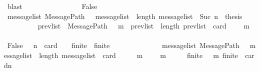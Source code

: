 \begin{isabellebody}
\ blast\isanewline
\ \ \ \ \ \ \isamarkupfalse%
\isanewline
\ \ \ \ \ \ \ \ \isamarkupfalse%
\ False\isanewline
\ \ \ \ \ \ \ \ \isamarkupfalse%
\ {\isachardoublequoteopen}{\isasymAnd}message{\isacharunderscore}list{\isachardot}\ MessagePath\ {\isasymsigma}\ {\isasymsigma}{\isacharprime}\ message{\isacharunderscore}list\ {\isasymand}\ length\ message{\isacharunderscore}list\ {\isacharequal}\ Suc\ n\ {\isasymLongrightarrow}\ thesis{\isachardoublequoteclose}\isanewline
\ \ \ \ \ \ \ \ \isamarkupfalse%
\ prev{\isacharunderscore}list\ \ {\isachardoublequoteopen}MessagePath\ {\isacharparenleft}{\isasymsigma}\ {\isasymunion}\ {\isacharbraceleft}m{\isacharbraceright}{\isacharparenright}\ {\isasymsigma}{\isacharprime}\ prev{\isacharunderscore}list\ {\isasymand}\ length\ prev{\isacharunderscore}list\ {\isacharequal}\ card\ {\isacharparenleft}{\isasymsigma}{\isacharprime}\ {\isacharminus}\ {\isacharparenleft}{\isasymsigma}\ {\isasymunion}\ {\isacharbraceleft}m{\isacharbraceright}{\isacharparenright}{\isacharparenright}{\isachardoublequoteclose}\isanewline
\ \ \ \ \ \ \ \ \ \ \isamarkupfalse%
\ False\ {\isacartoucheopen}{\isasymAnd}{\isasymsigma}{\isacharprime}\ {\isasymsigma}{\isachardot}\ {\isasymlbrakk}n\ {\isacharequal}\ card\ {\isacharparenleft}{\isasymsigma}{\isacharprime}\ {\isacharminus}\ {\isasymsigma}{\isacharparenright}{\isacharsemicolon}\ finite\ {\isasymsigma}{\isacharsemicolon}\ finite\ {\isasymsigma}{\isacharprime}{\isacharsemicolon}\ {\isasymsigma}\ {\isasymnoteq}\ {\isasymsigma}{\isacharprime}{\isacharsemicolon}\ {\isasymsigma}\ {\isasymin}\ {\isasymSigma}{\isacharsemicolon}\ {\isasymsigma}{\isacharprime}\ {\isasymin}\ {\isasymSigma}{\isacharsemicolon}\ {\isasymsigma}\ {\isasymsubseteq}\ {\isasymsigma}{\isacharprime}{\isasymrbrakk}\ {\isasymLongrightarrow}\ {\isasymexists}message{\isacharunderscore}list{\isachardot}\ MessagePath\ {\isasymsigma}\ {\isasymsigma}{\isacharprime}\ message{\isacharunderscore}list\ {\isasymand}\ length\ message{\isacharunderscore}list\ {\isacharequal}\ card\ {\isacharparenleft}{\isasymsigma}{\isacharprime}\ {\isacharminus}\ {\isasymsigma}{\isacharparenright}{\isacartoucheclose}\ {\isacartoucheopen}{\isasymsigma}\ {\isasymunion}\ {\isacharbraceleft}m{\isacharbraceright}\ {\isasymin}\ {\isasymSigma}{\isacartoucheclose}\ {\isacartoucheopen}{\isasymsigma}\ {\isasymunion}\ {\isacharbraceleft}m{\isacharbraceright}\ {\isasymsubseteq}\ {\isasymsigma}{\isacharprime}{\isacartoucheclose}\ {\isacartoucheopen}{\isasymsigma}{\isacharprime}\ {\isasymin}\ {\isasymSigma}{\isacartoucheclose}\ {\isacartoucheopen}finite\ {\isacharparenleft}{\isasymsigma}\ {\isasymunion}\ {\isacharbraceleft}m{\isacharbraceright}{\isacharparenright}{\isacartoucheclose}\ {\isacartoucheopen}finite\ {\isasymsigma}{\isacharprime}{\isacartoucheclose}\ cardn\ \isamarkupfalse%

\end{isabellebody}
